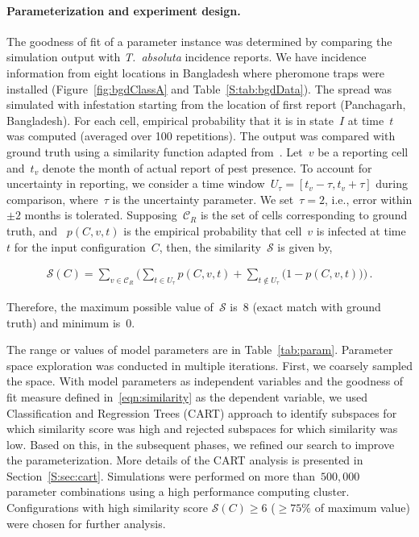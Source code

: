 \documentclass[11pt]{article}
\newcommand{\tuta}{\emph{T.~absoluta}}
\newcommand{\reportingCells}{\mathcal{C}_R}
\newcommand{\similarity}{\mathcal{S}}
\theoremstyle{definition}
\begin{document}
\paragraph{Parameterization and experiment design.}
The goodness of fit of a parameter instance was determined by comparing the
simulation output with \tuta{} incidence reports. We have incidence
information from eight locations in Bangladesh where pheromone traps were
installed (Figure~\ref{fig:bgdClassA} and Table~\ref{S:tab:bgdData}). The
spread was simulated with infestation starting from the location of first
report (Panchagarh, Bangladesh). For each cell, empirical probability that
it is in state~$I$ at time~$t$ was computed (averaged over 100
repetitions). The output was compared with ground truth using a similarity
function adapted from~\cite{carrasco2010unveiling}.  Let~$v$ be a reporting
cell and~$t_v$ denote the month of actual report of pest presence.  To
account for uncertainty in reporting, we consider a time
window~$U_\tau=[t_v-\tau,t_v+\tau]$ during comparison, where~$\tau$ is the
uncertainty parameter. We set~$\tau=2$, i.e., error within $\pm2$ months is
tolerated.  Supposing~$\reportingCells$ is the set of cells corresponding
to ground truth,  and ~$p(C,v,t)$ is the empirical probability that cell~$v$
is infected at time~$t$ for the input configuration~$C$, then, the similarity~$\similarity$ is
given by,
\begin{linenomath}
\begin{align}\label{eqn:similarity}
    \similarity(C)=\sum_{v\in\reportingCells} \Big(\sum_{t\in U_\tau}p(C,v,t)
    + \sum_{t\notin U_\tau}\big(1-p(C,v,t)\big) \Big)\,.
\end{align}
\end{linenomath}
Therefore, the maximum possible value
of~$\similarity$ is~$8$ (exact match with ground truth) and minimum is~$0$.

The range or values of model parameters are in Table~\ref{tab:param}.
Parameter space exploration was conducted in multiple iterations.  First,
we coarsely sampled the space. With model parameters as independent
variables and the goodness of fit measure defined in~\eqref{eqn:similarity}
as the dependent variable, we used Classification and Regression Trees
(CART) approach to identify subspaces for which similarity score was high
and rejected subspaces for which similarity was low. Based on this, in the
subsequent phases, we refined our search to improve the parameterization.
More details of the CART analysis is presented in Section~\ref{S:sec:cart}.
Simulations were performed on more than~$500,000$ parameter combinations
using a high performance computing cluster. Configurations with high
similarity score $\similarity(C)\ge6$ ($\ge75\%$ of maximum value) were
chosen for further analysis.
\end{document}
